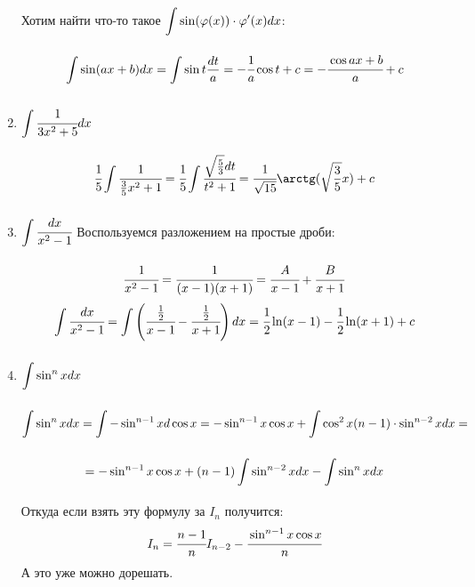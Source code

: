 \begin{enumerate}
    Хотим найти что-то такое $\displaystyle\int\limits_{}^{}\sin(\varphi(x))\cdot \varphi'(x) dx$:
    $$\displaystyle\int\limits_{}^{}\sin (ax+b)dx = \displaystyle\int\limits_{}^{}\sin t  \frac{dt}{a} = -\cfrac{1}{a}\cos t + c = -\cfrac{\cos ax+b}{a}+c$$
    \item $\displaystyle\int\limits_{}^{}\cfrac{1}{3x^2+5}dx$
    $$\cfrac{1}{5}\integral{}{}\cfrac{1}{\frac{3}{5}x^2+1} = \cfrac{1}{5}\integral{}{}\cfrac{\sqrt{\frac{5}{3}}dt}{t^2+1} =\cfrac{1}{\sqrt{15}} \arctg (\sqrt{\frac{3}{5}}x)+c$$    
    \item $\displaystyle\int\limits_{}^{}\cfrac{dx}{x^2-1}$
    Воспользуемся разложением на простые дроби:
    $$\cfrac{1}{x^2-1} = \cfrac{1}{(x-1)(x+1)} = \cfrac{A}{x-1}+ \cfrac{B}{x+1}$$
    $$\displaystyle\int\limits_{}^{}\cfrac{dx}{x^2-1}=\displaystyle\int\limits_{}^{}\left(\cfrac{\frac{1}{2}}{x-1}-\cfrac{\frac{1}{2}}{x+1}\right) dx = \cfrac{1}{2}\ln (x-1) - \cfrac{1}{2}\ln(x+1)+c$$
    \item $\displaystyle\int\limits_{}^{}\sin^nxdx$
    $$\displaystyle\int\limits_{}^{}\sin^nxdx = \displaystyle\int\limits_{}^{} -\sin^{n-1}x d\cos x = -\sin^{n-1}x\cos x + \displaystyle\int\limits_{}^{}\cos^2 x(n-1)\cdot \sin^{n-2}x dx = $$$$=-\sin^{n-1}x\cos x  +(n-1) \displaystyle\int\limits_{}^{}\sin^{n-2}x dx - \displaystyle\int\limits_{}^{}\sin^n x dx$$
    Откуда если взять эту формулу за $I_n$ получится:
    $$I_n = \cfrac{n-1}{n}I_{n-2} - \cfrac{\sin^{n-1}x \cos x}{n}$$
    А это уже можно дорешать.
\end{enumerate}

